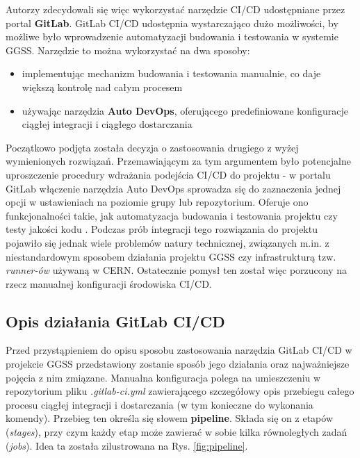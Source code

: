 Autorzy zdecydowali się więc wykorzystać narzędzie CI/CD udostępniane przez portal \textbf{GitLab}. GitLab CI/CD udostępnia wystarczająco dużo możliwości, by możliwe było wprowadzenie automatyzacji budowania i testowania w systemie GGSS. Narzędzie to można wykorzystać na dwa sposoby:
\begin{itemize}
\item implementując mechanizm budowania i testowania manualnie, co daje większą kontrolę nad całym procesem
\item używając narzędzia \textbf{Auto DevOps}, oferującego predefiniowane konfiguracje ciągłej integracji i ciągłego dostarczania
\end{itemize}
Początkowo podjęta została decyzja o zastosowania drugiego z wyżej wymienionych rozwiązań. Przemawiającym za tym argumentem było potencjalne uproszczenie procedury wdrażania podejścia CI/CD do projektu - w portalu GitLab włączenie narzędzia Auto DevOps sprowadza się do zaznaczenia jednej opcji w ustawieniach na poziomie grupy lub repozytorium. Oferuje ono funkcjonalności takie, jak automatyzacja budowania i testowania projektu czy testy jakości kodu \cite{AutoDevOpsPage}. Podczas prób integracji tego rozwiązania do projektu pojawiło się jednak wiele problemów natury technicznej, związanych m.in. z niestandardowym sposobem działania projektu GGSS czy infrastrukturą tzw. \textit{runner-ów} używaną w CERN. Ostatecznie pomysł ten został więc porzucony na rzecz manualnej konfiguracji środowiska CI/CD. 

\subsection{Opis działania GitLab CI/CD}
Przed przystąpieniem do opisu sposobu zastosowania narzędzia GitLab CI/CD w projekcie GGSS przedstawiony zostanie sposób jego działania oraz najważniejsze pojęcia z nim zmiązane. Manualna konfiguracja polega na umieszczeniu w repozytorium pliku \textit{.gitlab-ci.yml} zawierającego szczegółowy opis przebiegu całego procesu ciągłej integracji i dostarczania (w tym konieczne do wykonania komendy). Przebieg ten określa się słowem \textbf{pipeline}. Składa się on z etapów (\textit{stages}), przy czym każdy etap może zawierać w sobie kilka równoległych zadań (\textit{jobs}). Idea ta została zilustrowana na Rys. \ref{fig:pipeline}.


